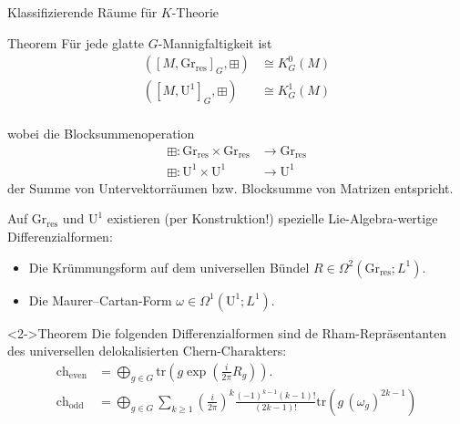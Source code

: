 \documentclass[12pt,utf8,notheorems,compress,t]{beamer}
\renewcommand{\_}{\mathpunct{.}}
\newcommand{\?}{\,{:}\,}
\newcommand{\tr}{\mathrm{tr}}
\newcommand{\ch}{\mathrm{ch}}
\newcommand{\grres}{\mathrm{Gr}_{\mathrm{res}}}
\begin{document}
\begin{frame}{Klassifizierende Räume für $K$-Theorie}
    \begin{block}{Theorem}
        Für jede glatte $G$-Mannigfaltigkeit ist 
        \begin{align*}
            ([M, \mathrm{Gr}_{\mathrm{res}}]_G,\boxplus) &\cong K_G^0(M) \\
            ([M, \mathrm{U}^1]_G,\boxplus) &\cong K_G^1(M) \\
        \end{align*}
    \end{block}
    wobei die Blocksummenoperation
    \begin{align*}
        \boxplus\colon \grres \times \grres &\to \grres \\\boxplus\colon
        \mathrm U^1 \times \mathrm
        U^1 &\to \mathrm U^1
    \end{align*}
    der Summe von Untervektorräumen bzw. Blocksumme von Matrizen entspricht.
\end{frame}
\begin{frame}
    Auf $\grres$ und $\mathrm U^1$ existieren (per Konstruktion!) spezielle
    Lie-Algebra-wertige Differenzialformen:
    \begin{itemize}
        \item Die Krümmungsform auf dem universellen Bündel $R\in
            \Omega^2(\mathrm{Gr}_{\mathrm{res}}; L^1)$.
        \item Die Maurer--Cartan-Form $\omega\in \Omega^1(\mathrm U^1;
            L^1)$.
    \end{itemize}
    \begin{block}<2->{Theorem}
        Die folgenden Differenzialformen sind de Rham-Repräsentanten des
        universellen delokalisierten Chern-Charakters:
        \begin{align*}
            \ch_{\mathrm{even}} &= \bigoplus_{g\in G} \tr \left( g \exp\left(
            \frac{i}{2\pi}R_g \right) \right). \\
            \ch_{\mathrm{odd}} &= \bigoplus_{g\in G} \sum_{k\geq 1}
            \left(\frac{i}{2\pi}\right)^{k}
            \frac{(-1)^{k-1}(k-1)!}{(2k-1)!}\tr \left(g\,
            (\omega_g)^{2k-1}\right)
        \end{align*}
    \end{block}
\end{frame}
\end{document}
